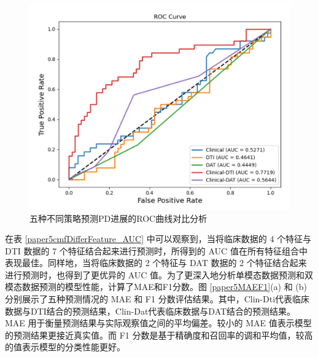     \begin{figure}[ht]
      \centering
      \includegraphics[width=0.95\linewidth]{figs/paper5ROCs_1case.pdf}
      \caption{五种不同策略预测PD进展的ROC曲线对比分析}\label{paper5ROCs_}
     \end{figure}


在表 \ref{paper5cmfDifferFeature_AUC} 中可以观察到，当将临床数据的 4 个特征与 DTI 数据的 7 个特征结合起来进行预测时，所得到的 AUC 值在所有特征组合中表现最佳。同样地，当将临床数据的 2 个特征与 DAT 数据的 2 个特征结合起来进行预测时，也得到了更优异的 AUC 值。为了更深入地分析单模态数据预测和双模态数据预测的模型性能，计算了MAE和F1分数。图 \ref{paper5MAEF1}(a) 和 (b) 分别展示了五种预测情况的 MAE 和 F1 分数评估结果。其中，Clin-Dti代表临床数据与DTI结合的预测结果，Clin-Dat代表临床数据与DAT结合的预测结果。MAE 用于衡量预测结果与实际观察值之间的平均偏差。较小的 MAE 值表示模型的预测结果更接近真实值。而 F1 分数是基于精确度和召回率的调和平均值，较高的值表示模型的分类性能更好。

